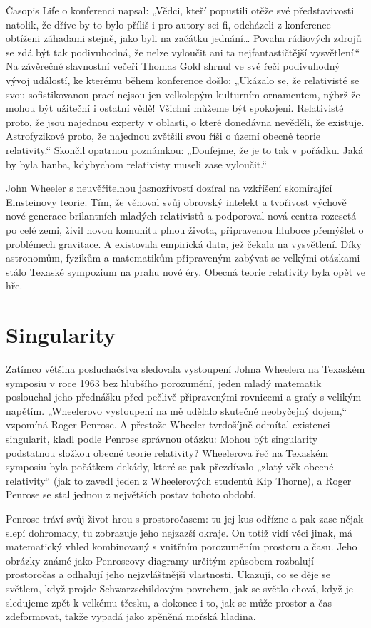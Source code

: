   Časopis Life o konferenci napsal: „Vědci, kteří popustili otěže své představivosti natolik, že
  dříve by to bylo příliš i pro autory sci-fi, odcházeli z konference obtíženi záhadami stejně, jako
  byli na začátku jednání… Povaha rádiových zdrojů se zdá být tak podivuhodná, že nelze vyloučit ani
  ta nejfantastičtější vysvětlení.“ Na závěrečné slavnostní večeři Thomas Gold shrnul ve své řeči
  podivuhodný vývoj událostí, ke kterému během konference došlo: „Ukázalo se, že relativisté se svou
  sofistikovanou prací nejsou jen velkolepým kulturním ornamentem, nýbrž že mohou být užiteční i
  ostatní vědě! Všichni můžeme být spokojeni. Relativisté proto, že jsou najednou experty v oblasti,
  o které donedávna nevěděli, že existuje. Astrofyzikové proto, že najednou zvětšili svou říši o
  území obecné teorie relativity.“ Skončil opatrnou poznámkou: „Doufejme, že je to tak v pořádku.
  Jaká by byla hanba, kdybychom relativisty museli zase vyloučit.“ 

  John Wheeler s neuvěřitelnou jasnozřivostí dozíral na vzkříšení skomírající Einsteinovy teorie.
  Tím, že věnoval svůj obrovský intelekt a tvořivost výchově nové generace brilantních mladých
  relativistů a podporoval nová centra rozesetá po celé zemi, živil novou komunitu plnou života,
  připravenou hluboce přemýšlet o problémech gravitace. A existovala empirická data, jež čekala na
  vysvětlení. Díky astronomům, fyzikům a matematikům připraveným zabývat se velkými otázkami stálo
  Texaské sympozium na prahu nové éry. Obecná teorie relativity byla opět ve hře. 

\section{Singularity}\label{feyIchIIIsecIX}
  Zatímco většina posluchačstva sledovala vystoupení Johna Wheelera na Texaském symposiu v roce 1963
  bez hlubšího porozumění, jeden mladý matematik poslouchal jeho přednášku před pečlivě připravenými
  rovnicemi a grafy s velikým napětím. „Wheelerovo vystoupení na mě udělalo skutečně neobyčejný
  dojem,“ vzpomíná Roger Penrose. A přestože Wheeler tvrdošíjně odmítal existenci singularit, kladl
  podle Penrose správnou otázku: Mohou být singularity podstatnou složkou obecné teorie relativity?
  Wheelerova řeč na Texaském symposiu byla počátkem dekády, které se pak přezdívalo „zlatý věk
  obecné relativity“ (jak to zavedl jeden z Wheelerových studentů Kip Thorne), a Roger Penrose se
  stal jednou z největších postav tohoto období. 

  Penrose tráví svůj život hrou s prostoročasem: tu jej kus odřízne a pak zase nějak slepí
  dohromady, tu zobrazuje jeho nejzazší okraje. On totiž vidí věci jinak, má matematický vhled
  kombinovaný s vnitřním porozuměním prostoru a času. Jeho obrázky známé jako Penroseovy diagramy
  určitým způsobem rozbalují prostoročas a odhalují jeho nejzvláštnější vlastnosti. Ukazují, co se
  děje se světlem, když projde Schwarzschildovým povrchem, jak se světlo chová, když je sledujeme
  zpět k velkému třesku, a dokonce i to, jak se může prostor a čas zdeformovat, takže vypadá jako
  zpěněná mořská hladina. 

